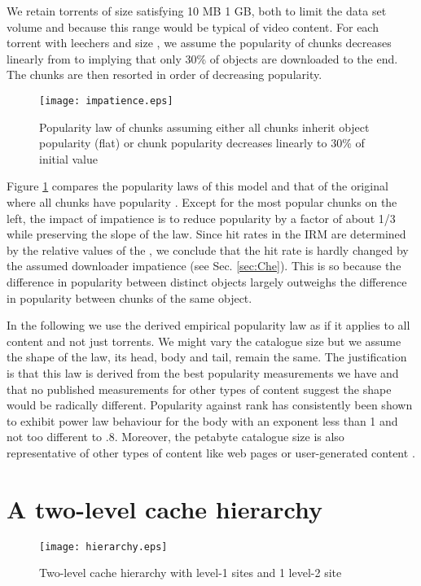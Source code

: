 \documentclass [11pt]{article}
\begin{document}
We retain torrents of size  satisfying 10 MB  1 GB, both to limit the data set volume and because this range would be typical of video content. For each torrent with  leechers and size , we assume the popularity of chunks decreases linearly from  to  implying that only 30\% of objects are downloaded to the end. The chunks are then resorted in order of decreasing popularity. 

\begin{figure}[tp]
 \centering
 \texttt{[image: impatience.eps]}
 \caption{Popularity law of chunks assuming either all chunks inherit object popularity (flat) or chunk popularity decreases linearly to 30\% of initial value}
 \label{fig:impatience}
\end{figure}

Figure \ref{fig:impatience} compares the popularity laws of this model and that of the original where all chunks have popularity . Except for the most popular chunks on the left, the impact of impatience is to reduce popularity by a factor of about 1/3 while preserving the slope of the law. Since hit rates in the IRM are determined by the relative values of the , we conclude that the hit rate is hardly changed by the assumed downloader impatience (see Sec. \ref{sec:Che}). This is so because the difference in popularity between distinct objects largely outweighs the difference in popularity between chunks of the same object.

In the following we use the derived empirical popularity law as if it applies to all content and not just torrents. We might vary the catalogue size but we assume the shape of the law, its head, body and tail, remain the same. The justification is that this law is derived from the best popularity measurements we have and that no published measurements for other types of content suggest the shape would be radically different. Popularity against rank has consistently been shown to exhibit  power law behaviour for the body with an exponent less than 1 and not too different to .8. Moreover, the petabyte catalogue size is also representative of other types of content like web pages or user-generated content \cite{FRRS12}.

\section{A two-level cache hierarchy}
\label{sec:hierarchy}

        \begin{figure}[h]
                       \centering
                \texttt{[image: hierarchy.eps]}
\caption{Two-level cache hierarchy with  level-1 sites and 1 level-2 site}
                \label{fig:hierarchy}
        \end{figure}
\end{document}
